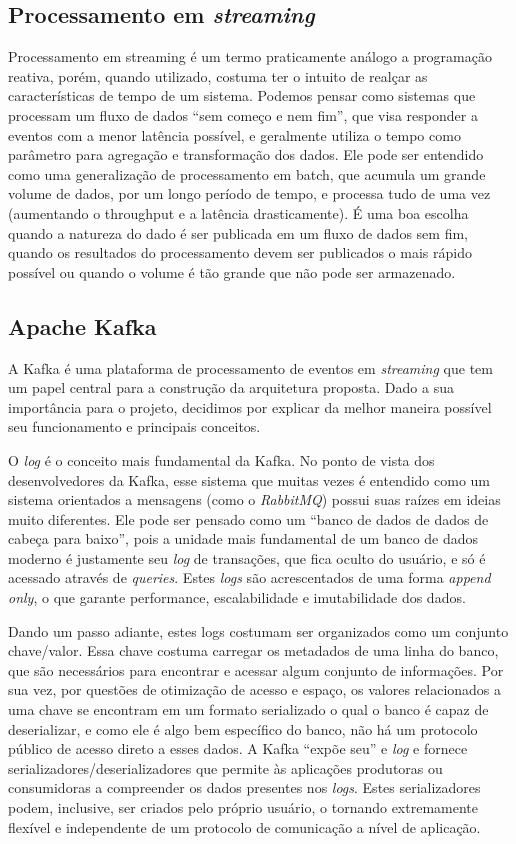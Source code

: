 \documentclass[12pt]{article}
\begin{document}
\subsection{Processamento em \textit{streaming}}
Processamento em streaming é um termo praticamente análogo a programação reativa, porém, quando utilizado, costuma ter o intuito de realçar as características de tempo de um sistema. Podemos pensar como sistemas que processam um fluxo de dados “sem começo e nem fim”, que visa responder a eventos com a menor latência possível, e geralmente utiliza o tempo como parâmetro para agregação e transformação dos dados. Ele pode ser entendido como uma generalização de processamento em batch, que acumula um grande volume de dados, por um longo período de tempo, e processa tudo de uma vez (aumentando o throughput e a latência drasticamente). É uma boa escolha quando a natureza do dado é ser publicada em um fluxo de dados sem fim, quando os resultados do processamento devem ser publicados o mais rápido possível ou quando o volume é tão grande que não pode ser armazenado.




\subsection{Apache Kafka}

A Kafka é uma plataforma de processamento de eventos em \textit{streaming} que tem um papel central para a construção da arquitetura proposta. Dado a sua importância para o projeto, decidimos por explicar da melhor maneira possível seu funcionamento e principais conceitos.

O \textit{log} é o conceito mais fundamental da Kafka. No ponto de vista dos desenvolvedores da Kafka, esse sistema que muitas vezes é entendido como um sistema orientados a mensagens (como o \textit{RabbitMQ}) possui suas raízes em ideias muito diferentes. Ele pode ser pensado como um “banco de dados de dados de cabeça para baixo”, pois a unidade mais fundamental de um banco de dados moderno é justamente seu \textit{log} de transações, que fica oculto do usuário, e só é acessado através de \textit{queries}. Estes \textit{logs} são acrescentados de uma forma \textit{append only}, o que garante performance, escalabilidade e imutabilidade dos dados.

Dando um passo adiante, estes logs costumam ser organizados como um conjunto chave/valor. Essa chave costuma carregar os metadados de uma linha do banco, que são necessários para encontrar e acessar algum conjunto de informações. Por sua vez, por questões de otimização de acesso e espaço, os valores relacionados a uma chave se encontram em um formato serializado o qual o banco é capaz de deserializar, e como ele é algo bem específico do banco, não há um protocolo público de acesso direto a esses dados. A Kafka “expõe seu” e \textit{log} e fornece serializadores/deserializadores que permite às aplicações produtoras ou consumidoras a compreender os dados presentes nos \textit{logs}. Estes serializadores podem, inclusive, ser criados pelo próprio usuário, o tornando extremamente flexível e independente de um protocolo de comunicação a nível de aplicação.
\end{document}
